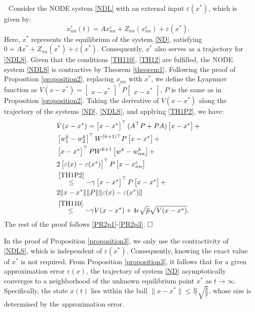\documentclass[journal,twoside,web]{ieeecolor}
\renewenvironment{proof}{\vspace{.1cm}\noindent{\sc Proof.}\hspace{0.10cm}\,\,}{$\hfill\Box$\vspace{.1cm}}
\newcommand{\bbm}[1]{\left[\begin{matrix} #1 \end{matrix}\right]}
\begin{document}
\begin{proof}
Consider the NODE system \eqref{NDL} with an external input $\varepsilon(x^*)$, which is given by:
 \begin{equation}\label{NDLS}
\dot{x}_{nn}^{\varepsilon}(t)=Ax_{nn}^{\varepsilon}+Z_{nn}(x_{nn}^{\varepsilon})+\varepsilon(x^*).
\end{equation}
Here, $x^*$ represents the equilibrium of the system \eqref{ND}, satisfying $0=Ax^*+Z_{nn}(x^*)+\varepsilon(x^*)$. Consequently, $x^*$ also serves as a trajectory for \eqref{NDLS}. Given that the conditions \eqref{TH110}, \eqref{TH12} are fulfilled, the NODE system \eqref{NDLS} is contractive by Theorem \ref{theorem1}. Following the proof of Proposition \ref{proposition2}, replacing $x_{nn}$ with $x^*$, we define the Lyapunov function as $V(x-x^*)=\bbm{x-x^*}^\top P \bbm{x-x^*}$, $P$ is the same as in Proposition \ref{proposition2}. Taking the derivative of $V(x-x^*)$ along the trajectory of the systems \eqref{ND}, \eqref{NDLS}, and applying \eqref{TH1P2}, we have:
\begin{equation}\label{TH2P3}
\begin{aligned}
&\dot{V}(x-x^*)
=\bbm{x-x^*}^\top( A^\top P+PA)\bbm{x-x^*}+\\&\bbm{w_1^k-w_{2}^k}^\top W^{(k+1)\top}P\bbm{x-x^*}+\\&\bbm{x-x^*}^\top PW^{k+1}\bbm{w^k-w_{nn}^k}+\\&2\bbm{\varepsilon(x)-\varepsilon(x^*)}^\top P\bbm{x-x_{nn}^{\varepsilon}}\\&\overset{\eqref{TH1P2}}{\leq}-\gamma \bbm{x-x^*}^\top P \bbm{x-x^*}+\\&2\|x-x^*\|\|P\|\|\varepsilon(x)-\varepsilon(x^*)\|\\&\overset{\eqref{TH110}}{\leq}-\gamma V(x-x^*)+4\epsilon\sqrt{\overline{p}}\sqrt{V(x-x^*)}.
\end{aligned}
\end{equation}
The rest of the proof follows \eqref{PR2p1}-\eqref{PR2p3}. 
\end{proof}

In the proof of Proposition \ref{proposition3}, we only use the contractivity of \eqref{NDLS}, which is independent of $\varepsilon(x^*)$. Consequently, knowing the exact value of $x^*$ is not required. From Proposition \ref{proposition3}, it follows that for a given approximation error $\varepsilon(x)$, the trajectory of system \eqref{ND} asymptotically converges to a neighborhood of the unknown equilibrium point $x^*$ as $t\to \infty$. Specifically, the state $x(t)$ lies within the ball $\|x-x^*\|\leq \frac{4\epsilon}{\gamma}\sqrt{\frac{\overline{p}}{\underline{p}}}$, whose size is determined by the approximation error.
\end{document}
